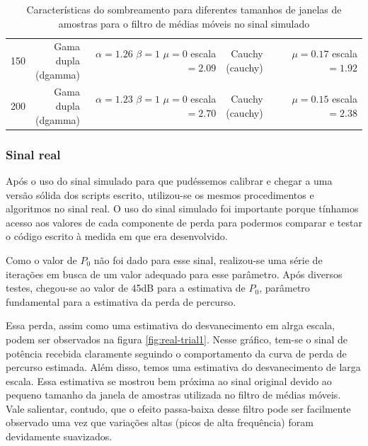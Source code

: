 \documentclass[journal,11pt,twocolumn]{IEEEtran}
\begin{document}
\begin{table}[h!]
\begin{tabular}{r|r|r|r|r}
        150 & \makecell[r]{Gama\\dupla\\(dgamma)} & \makecell[r]{$\alpha=1.26$\\$\beta=1$\\$\mu=0$\\escala $=2.09$} & \makecell[r]{Cauchy\\(cauchy)} & \makecell[r]{$\mu=0.17$\\escala $=1.92$}\\
        200 & \makecell[r]{Gama\\dupla\\(dgamma)} & \makecell[r]{$\alpha=1.23$\\$\beta=1$\\$\mu=0$\\escala $=2.70$} & \makecell[r]{Cauchy\\(cauchy)} & \makecell[r]{$\mu=0.15$\\escala $=2.38$}
    \end{tabular}
    \caption{Características do sombreamento para diferentes tamanhos de janelas de amostras para o filtro de médias móveis no sinal simulado}
    \label{tab:small-scale-fading}
\end{table}

\subsubsection{Sinal real}

Após o uso do sinal simulado para que pudéssemos calibrar e chegar a uma versão sólida dos scripts escrito, utilizou-se os mesmos procedimentos e algoritmos no sinal real. O uso do sinal simulado foi importante porque tínhamos acesso aos valores de cada componente de perda para podermos comparar e testar o código escrito à medida em que era desenvolvido.

Como o valor de $P_{0}$ não foi dado para esse sinal, realizou-se uma série de iterações em busca de um valor adequado para esse parâmetro. Após diversos testes, chegou-se ao valor de 45dB para a estimativa de $P_{0}$, parâmetro fundamental para a estimativa da perda de percurso.

Essa perda, assim como uma estimativa do desvanecimento em alrga escala, podem ser observados na figura \ref{fig:real-trial1}. Nesse gráfico, tem-se o sinal de potência recebida claramente seguindo o comportamento da curva de perda de percurso estimada. Além disso, temos uma estimativa do desvanecimento de larga escala. Essa estimativa se mostrou bem próxima ao sinal original devido ao pequeno tamanho da janela de amostras utilizada no filtro de médias móveis. Vale salientar, contudo, que o efeito passa-baixa desse filtro pode ser facilmente observado uma vez que variações altas (picos de alta frequência) foram devidamente suavizados.
\end{document}
